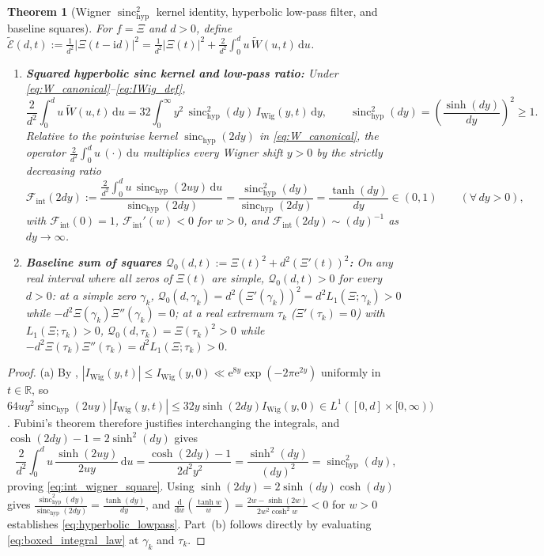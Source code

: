 \documentclass[11pt,a4paper,reqno]{amsart}
\newtheorem{theorem}{Theorem}[section]
\theoremstyle{definition}
\theoremstyle{remark}
\numberwithin{equation}{section}
\newcommand{\dd}{\mathrm{d}}
\newcommand{\ii}{\mathrm{i}}
\newcommand{\ee}{\mathrm{e}}
\newcommand{\Wtil}{\widetilde{W}}
\newcommand{\Etil}{\widetilde{\mathcal{E}}}
\newcommand{\sinch}{\operatorname{sinc}_{\mathrm{hyp}}}
\newcommand{\Fint}{\mathcal{F}_{\mathrm{int}}}
\begin{document}
\begin{theorem}[Wigner $\sinch^2$ kernel identity, hyperbolic low-pass filter, and baseline squares]\label{thm:lowpass_and_squares}
For $f = \Xi$ and $d > 0$, define $\Etil(d,t) := \frac{1}{d^2}|\Xi(t-\ii d)|^2 = \frac{1}{d^2}|\Xi(t)|^2 + \frac{2}{d^2}\int_0^d u\,\Wtil(u,t)\,\dd u$.
\begin{enumerate}
\item[\textup{(a)}] \textbf{Squared hyperbolic sinc kernel and low-pass ratio:} Under \eqref{eq:W_canonical}--\eqref{eq:IWig_def},
\begin{equation}\label{eq:int_wigner_square}
\frac{2}{d^2}\int_0^d u\,\Wtil(u,t)\,\dd u = 32\int_0^\infty y^2\,\sinch^2(d y)\,I_{\mathrm{Wig}}(y,t)\,\dd y, \qquad
\sinch^2(d y) = \left(\frac{\sinh(d y)}{d y}\right)^2 \ge 1.
\end{equation}
Relative to the pointwise kernel $\sinch(2d y)$ in \eqref{eq:W_canonical}, the operator $\frac{2}{d^2}\int_0^d u\,(\cdot)\,\dd u$ multiplies every Wigner shift $y > 0$ by the strictly decreasing ratio
\begin{equation}\label{eq:hyperbolic_lowpass}
\Fint(2d y) := \frac{\frac{2}{d^2}\int_0^d u\,\sinch(2u y)\,\dd u}{\sinch(2d y)} = \frac{\sinch^2(d y)}{\sinch(2d y)} = \frac{\tanh(d y)}{d y} \in (0, 1) \qquad (\forall\, d y > 0),
\end{equation}
with $\Fint(0) = 1$, $\Fint'(w) < 0$ for $w > 0$, and $\Fint(2d y) \sim (d y)^{-1}$ as $d y \to \infty$.
\item[\textup{(b)}] \textbf{Baseline sum of squares $\mathcal{Q}_0(d,t) := \Xi(t)^2 + d^2(\Xi'(t))^2$:} On any real interval where all zeros of $\Xi(t)$ are simple, $\mathcal{Q}_0(d,t) > 0$ for every $d > 0$: at a simple zero $\gamma_k$, $\mathcal{Q}_0(d,\gamma_k) = d^2(\Xi'(\gamma_k))^2 = d^2 L_1(\Xi;\gamma_k) > 0$ while $-d^2\Xi(\gamma_k)\Xi''(\gamma_k) = 0$; at a real extremum $\tau_k$ ($\Xi'(\tau_k) = 0$) with $L_1(\Xi;\tau_k) > 0$, $\mathcal{Q}_0(d,\tau_k) = \Xi(\tau_k)^2 > 0$ while $-d^2\Xi(\tau_k)\Xi''(\tau_k) = d^2 L_1(\Xi;\tau_k) > 0$.
\end{enumerate}
\end{theorem}

\begin{proof}
(a) By \cite[Theorem~1.1]{Missiaen2026Paper1}, $|I_{\mathrm{Wig}}(y,t)| \le I_{\mathrm{Wig}}(y,0) \ll \ee^{8y}\exp(-2\pi\ee^{2y})$ uniformly in $t \in \mathbb{R}$, so $64 u y^2\sinch(2u y)|I_{\mathrm{Wig}}(y,t)| \le 32 y\sinh(2d y)I_{\mathrm{Wig}}(y,0) \in L^1([0,d]\times[0,\infty))$. Fubini's theorem therefore justifies interchanging the integrals, and $\cosh(2d y) - 1 = 2\sinh^2(d y)$ gives
\[
\frac{2}{d^2}\int_0^d u\,\frac{\sinh(2u y)}{2u y}\,\dd u = \frac{\cosh(2d y) - 1}{2d^2 y^2} = \frac{\sinh^2(d y)}{(d y)^2} = \sinch^2(d y),
\]
proving \eqref{eq:int_wigner_square}. Using $\sinh(2d y) = 2\sinh(d y)\cosh(d y)$ gives $\frac{\sinch^2(d y)}{\sinch(2d y)} = \frac{\tanh(d y)}{d y}$, and $\frac{\dd}{\dd w}(\frac{\tanh w}{w}) = \frac{2w - \sinh(2w)}{2w^2\cosh^2 w} < 0$ for $w > 0$ establishes \eqref{eq:hyperbolic_lowpass}. Part~(b) follows directly by evaluating \eqref{eq:boxed_integral_law} at $\gamma_k$ and $\tau_k$.
\end{proof}
\end{document}
